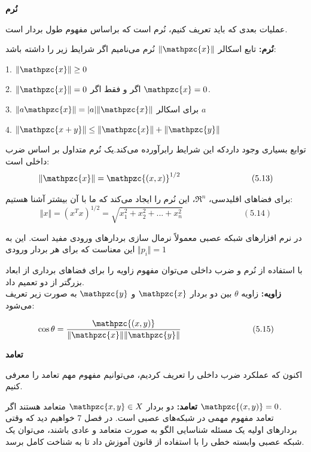 \documentclass[a4paper,12pt]{report}
\begin{document}
	\noindent\textbf{\Large{نُرم}}	
	
	عملیات بعدی که باید تعریف کنیم، نُرم است که براساس مفهوم طول بردار است.
	
	\textbf{نُرم:} تابع اسکالر 
	$ \Vert \mathpzc{x} \Vert$
	 نُرم می‌نامیم اگر شرایط زیر را داشته باشد:
	
	1. $ \Vert \mathpzc{x} \Vert \geq 0 $
	
	2. $ \Vert \mathpzc{x} \Vert = 0 $ اگر و فقط اگر $ \mathpzc{x}=0 $.	
	
	3. $ \Vert a\mathpzc{x} \Vert = \vert a \vert \Vert \mathpzc{x} \Vert $ برای اسکالر $ a $
	
	4. $ \Vert \mathpzc{x+y} \Vert \leq \Vert \mathpzc{x} \Vert + \Vert \mathpzc{y} \Vert $
	
	توابع بسیاری وجود داردکه این شرایط رابرآورده می‌کند.یک نُرم متداول بر اساس ضرب داخلی است:
	$$
	\Vert \mathpzc{x} \Vert = \mathpzc{(x,x)}^{1/2} \hspace{3cm} (5.13)
	$$
	
	برای فضاهای اقلیدسی، $ \Re^n $، این نُرم را ایجاد می‌کند که ما با آن بیشتر آشنا هستیم:
	$$
	\Vert x \Vert = (x^Tx)^{1/2} = \sqrt{x_1^2+x_2^2+...+x_n^2} \hspace{3cm} (5.14)
	$$
	
	در نرم افزارهای شبکه عصبی معمولاً نرمال سازی بردارهای ورودی مفید است. این به این معناست که برای هر بردار ورودی
	 $ \Vert p_i \Vert = 1  $
	 
	 با استفاده از نُرم و ضرب داخلی می‌توان مفهوم زاویه را برای فضاهای برداری از ابعاد بزرگتر از دو تعمیم داد.\\
	 
	 \textbf{زاویه:}
	 زاویه $ \theta $ بین دو بردار $ \mathpzc{x} $ و $ \mathpzc{y} $ به صورت زیر تعریف می‌شود:
	 
	 $$
	 \cos \theta = \frac{\mathpzc{(x,y)}}{\Vert \mathpzc{x} \Vert \Vert \mathpzc{y} \Vert} \hspace{3cm} (5.15)
	 $$
	 
	 \noindent\textbf{\Large تعامد}
	 
	 اکنون که عملکرد ضرب داخلی را تعریف کردیم، می‌توانیم مفهوم مهم تعامد را معرفی کنیم.
	 
	 \textbf{تعامد:}
	 دو بردار $ \mathpzc{x,y} \in X $ متعامد هستند اگر $ \mathpzc{(x,y)}=0 $.\\
	 
	 تعامد مفهوم مهمی در شبکه‌های عصبی است. در فصل 7 خواهیم دید که وقتی بردارهای اولیه یک مسئله شناسایی الگو به صورت متعامد و عادی باشند، می‌توان یک شبکه عصبی وابسته خطی را با استفاده از قانون  آموزش داد تا به شناخت کامل برسد.
	 
\end{document}
